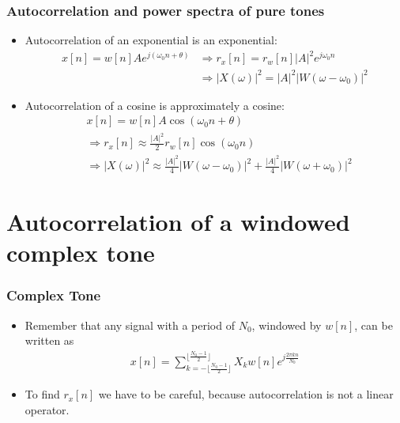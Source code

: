 \documentclass{beamer}
\begin{document}
\begin{frame}
  \frametitle{Autocorrelation and power spectra of pure tones}

  \begin{itemize}
  \item Autocorrelation of an exponential is an exponential:
    \begin{align*}
      x[n]=w[n]Ae^{j(\omega_0 n+\theta)} &\Rightarrow r_x[n]=r_w[n]|A|^2e^{j\omega_0 n}\\
      &\Rightarrow |X(\omega)|^2=|A|^2|W(\omega-\omega_0)|^2
    \end{align*}
  \item Autocorrelation of a cosine is approximately a cosine:
    \begin{align*}
      &x[n]=w[n]A\cos(\omega_0 n+\theta) \\
      &\Rightarrow r_x[n]\approx \frac{|A|^2}{2}r_w[n]\cos(\omega_0 n)\\
      &\Rightarrow |X(\omega)|^2\approx
      \frac{|A|^2}{4}|W(\omega-\omega_0)|^2+\frac{|A|^2}{4}|W(\omega+\omega_0)|^2
    \end{align*}
  \end{itemize}
\end{frame}

\section[Complex Tone]{Autocorrelation of a windowed complex tone}

\begin{frame}
  \frametitle{Complex Tone}

  \begin{itemize}
  \item Remember that any signal with a period of $N_0$, windowed by
    $w[n]$, can be written as
    \begin{align*}
      x[n] = \sum_{k=-\lfloor\frac{N_0-1}{2}\rfloor}^{\lfloor\frac{N_0-1}{2}\rfloor} X_k w[n]e^{j\frac{2\pi kn}{N_0}}
    \end{align*}
  \item To find $r_x[n]$ we have to be careful, because
    autocorrelation is not a linear operator.
  \end{itemize}
\end{frame}
\end{document}
